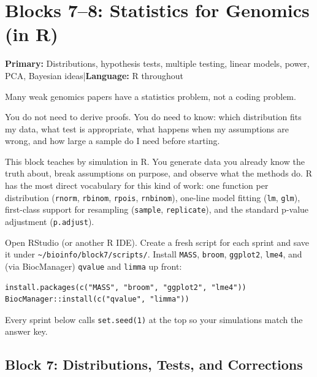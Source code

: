 \chapter{Blocks 7--8: Statistics for Genomics (in R)}\label{chap:stats}

\textbf{Primary:} Distributions, hypothesis tests, multiple testing, linear models, power, PCA, Bayesian ideas\quad|\quad\textbf{Language:} R throughout

\begin{brainbox}
Many weak genomics papers have a statistics problem, not a coding problem.

You do not need to derive proofs. You do need to know: which distribution fits my data, what test is appropriate, what happens when my assumptions are wrong, and how large a sample do I need before starting.

This block teaches by simulation in R. You generate data you already know the truth about, break assumptions on purpose, and observe what the methods do. R has the most direct vocabulary for this kind of work: one function per distribution (\texttt{rnorm}, \texttt{rbinom}, \texttt{rpois}, \texttt{rnbinom}), one-line model fitting (\texttt{lm}, \texttt{glm}), first-class support for resampling (\texttt{sample}, \texttt{replicate}), and the standard p-value adjustment (\texttt{p.adjust}).
\end{brainbox}

\begin{tipbox}
Open RStudio (or another R IDE). Create a fresh script for each sprint and save it under \texttt{\textasciitilde/bioinfo/block7/scripts/}. Install \texttt{MASS}, \texttt{broom}, \texttt{ggplot2}, \texttt{lme4}, and (via BiocManager) \texttt{qvalue} and \texttt{limma} up front:
\begin{lstlisting}
install.packages(c("MASS", "broom", "ggplot2", "lme4"))
BiocManager::install(c("qvalue", "limma"))
\end{lstlisting}
Every sprint below calls \texttt{set.seed(1)} at the top so your simulations match the answer key.
\end{tipbox}


\section{Block 7: Distributions, Tests, and Corrections}

